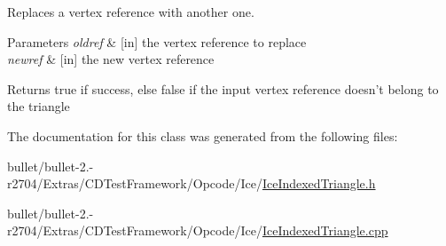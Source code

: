 Replaces a vertex reference with another one. 
\begin{DoxyParams}{Parameters}
{\em oldref} & \mbox{[}in\mbox{]} the vertex reference to replace \\
\hline
{\em newref} & \mbox{[}in\mbox{]} the new vertex reference \\
\hline
\end{DoxyParams}
\begin{DoxyReturn}{Returns}
true if success, else false if the input vertex reference doesn't belong to the triangle 
\end{DoxyReturn}


The documentation for this class was generated from the following files\+:\begin{DoxyCompactItemize}
\item 
bullet/bullet-\/2.-\/r2704/\+Extras/\+C\+D\+Test\+Framework/\+Opcode/\+Ice/\hyperlink{_ice_indexed_triangle_8h}{Ice\+Indexed\+Triangle.\+h}\item 
bullet/bullet-\/2.-\/r2704/\+Extras/\+C\+D\+Test\+Framework/\+Opcode/\+Ice/\hyperlink{_ice_indexed_triangle_8cpp}{Ice\+Indexed\+Triangle.\+cpp}\end{DoxyCompactItemize}
